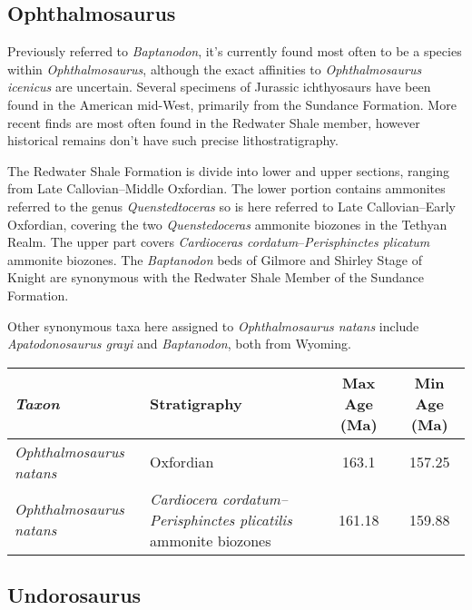 \documentclass[british]{article}
\begin{document}
\subsection{Ophthalmosaurus}%
\label{sub:ophthalmosaurus}

Previously referred to \emph{Baptanodon}, it’s currently found most often to be
a species within \emph{Ophthalmosaurus}, although the exact affinities to
\emph{Ophthalmosaurus icenicus} are uncertain. Several specimens of Jurassic
ichthyosaurs have been found in the American mid-West, primarily from the
Sundance Formation. More recent finds are most often found in the Redwater Shale
member, however historical remains don’t have such precise lithostratigraphy.

The Redwater Shale Formation is divide into lower and upper sections, ranging
from Late Callovian–Middle Oxfordian.\autocite{Kvale2001P} The lower portion
contains ammonites referred to the genus \emph{Quenstedtoceras} so is here
referred to Late Callovian–Early Oxfordian, covering the two
\emph{Quenstedoceras} ammonite biozones in the Tethyan Realm. The upper part
covers \emph{Cardioceras cordatum}–\emph{Perisphinctes plicatum} ammonite
biozones. The \emph{Baptanodon} beds of Gilmore and Shirley Stage of Knight are
synonymous with the Redwater Shale Member of the Sundance Formation.

Other synonymous taxa here assigned to \emph{Ophthalmosaurus natans} include
\emph{Apatodonosaurus grayi} and \emph{Baptanodon}, both from
Wyoming.\autocite{Mehl1928JSLDUG,Massare2014GM,Moon2016MPS}

\begin{table}[htb]
    \footnotesize
    {
    \begin{tabu}{>{\em}lXSS}
        \toprule
        Taxon                  & Stratigraphy & {Max Age (Ma)} & {Min Age (Ma)} \\
        \midrule
        Ophthalmosaurus natans & Oxfordian & 163.1 & 157.25 \\
        Ophthalmosaurus natans & \emph{Cardiocera cordatum–Perisphinctes plicatilis} ammonite biozones & 161.18 & 159.88 \\
        \bottomrule
    \end{tabu}}
\end{table}

\subsection{Undorosaurus}%
\label{sub:undorosaurus}



\printbibliography
    
\end{document}
